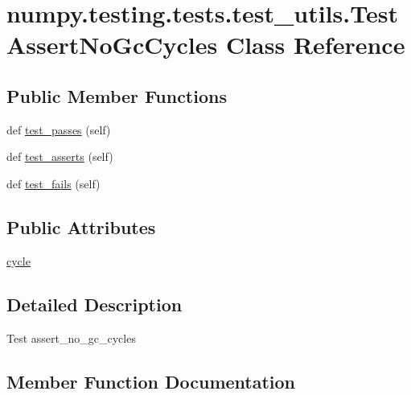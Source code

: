 \hypertarget{classnumpy_1_1testing_1_1tests_1_1test__utils_1_1TestAssertNoGcCycles}{}\section{numpy.\+testing.\+tests.\+test\+\_\+utils.\+Test\+Assert\+No\+Gc\+Cycles Class Reference}
\label{classnumpy_1_1testing_1_1tests_1_1test__utils_1_1TestAssertNoGcCycles}
\subsection*{Public Member Functions}
\begin{DoxyCompactItemize}
\item 
def \hyperlink{classnumpy_1_1testing_1_1tests_1_1test__utils_1_1TestAssertNoGcCycles_ae0547f04ed22c35c89359084f4119f75}{test\+\_\+passes} (self)
\item 
def \hyperlink{classnumpy_1_1testing_1_1tests_1_1test__utils_1_1TestAssertNoGcCycles_a8ed3ab1a369f34e2f3cdbcd92daaab1c}{test\+\_\+asserts} (self)
\item 
def \hyperlink{classnumpy_1_1testing_1_1tests_1_1test__utils_1_1TestAssertNoGcCycles_a86439e59a062f3eb32cc9e960be55f1c}{test\+\_\+fails} (self)
\end{DoxyCompactItemize}
\subsection*{Public Attributes}
\begin{DoxyCompactItemize}
\item 
\hyperlink{classnumpy_1_1testing_1_1tests_1_1test__utils_1_1TestAssertNoGcCycles_aa32d2b6ded4c96c408154f5eb8babc65}{cycle}
\end{DoxyCompactItemize}


\subsection{Detailed Description}
\begin{DoxyVerb}Test assert_no_gc_cycles \end{DoxyVerb}
 

\subsection{Member Function Documentation}
\mbox{\label{classnumpy_1_1testing_1_1tests_1_1test__utils_1_1TestAssertNoGcCycles_a8ed3ab1a369f34e2f3cdbcd92daaab1c}} 
